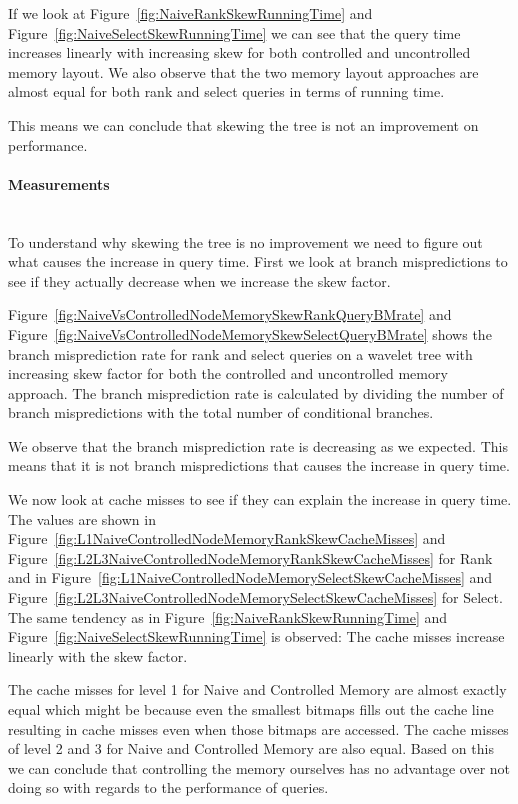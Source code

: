 If we look at Figure~\ref{fig:NaiveRankSkewRunningTime} and Figure~\ref{fig:NaiveSelectSkewRunningTime} we can see that the query time increases linearly with increasing skew for both controlled and uncontrolled memory layout. We also observe that the two memory layout approaches are almost equal for both rank and select queries in terms of running time.

This means we can conclude that skewing the tree is not an improvement on performance.

\paragraph{Measurements}~\\
To understand why skewing the tree is no improvement we need to figure out what causes the increase in query time. 
First we look at branch mispredictions to see if they actually decrease when we increase the skew factor.%

 
Figure~\ref{fig:NaiveVsControlledNodeMemorySkewRankQueryBMrate} and Figure~\ref{fig:NaiveVsControlledNodeMemorySkewSelectQueryBMrate} shows the branch misprediction rate for rank and select queries on a wavelet tree with increasing skew factor for both the controlled and uncontrolled memory approach. 
The branch misprediction rate is calculated by dividing the number of branch mispredictions with the total number of conditional branches.

We observe that the branch misprediction rate is decreasing as we expected. 
This means that it is not branch mispredictions that causes the increase in query time. 

We now look at cache misses to see if they can explain the increase in query time. 
The values are shown in Figure~\ref{fig:L1NaiveControlledNodeMemoryRankSkewCacheMisses} and Figure~\ref{fig:L2L3NaiveControlledNodeMemoryRankSkewCacheMisses} for Rank and in Figure~\ref{fig:L1NaiveControlledNodeMemorySelectSkewCacheMisses} and Figure~\ref{fig:L2L3NaiveControlledNodeMemorySelectSkewCacheMisses} for Select.
The same tendency as in Figure~\ref{fig:NaiveRankSkewRunningTime} and Figure~\ref{fig:NaiveSelectSkewRunningTime} is observed: 
The cache misses increase linearly with the skew factor.

The cache misses for level 1 for Naive and Controlled Memory are almost exactly equal which might be because even the smallest bitmaps fills out the cache line resulting in cache misses even when those bitmaps are accessed. 
The cache misses of level 2 and 3 for Naive and Controlled Memory are also equal. 
Based on this we can conclude that controlling the memory ourselves has no advantage over not doing so with regards to the performance of queries.

